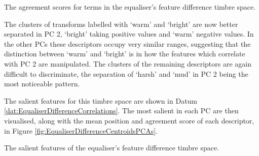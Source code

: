 			\begin{table}[h!]
				\centering
				
				\caption{The agreement scores for terms in the 
					 equaliser's feature difference timbre space.}
				\label{tab:EqualiserDifferenceAgreements}
			\end{table}

			The clusters of transforms labelled with `warm' and `bright' are now better separated in PC 2,
			`bright' taking positive values and `warm' negative values. In the other PCs these descriptors
			occupy very similar ranges, suggesting that the distinction between `warm' and `bright' is in how
			the features which correlate with PC 2 are manipulated. The clusters of the remaining descriptors
			are again difficult to discriminate, the separation of `harsh' and `mud' in PC 2 being the most
			noticeable pattern.

			The salient features for this timbre space are shown in Datum
			\ref{dat:EqualiserDifferenceCorrelations}. The most salient in each PC are then visualised, along
			with the mean position and agreement score of each descriptor, in Figure
			\ref{fig:EqualiserDifferenceCentroidsPCAs}. 

			\begin{datum}[h!]
				\centering
				\begin{minipage}{0.9\textwidth}
					
				\end{minipage}
				\caption{The salient features of the equaliser's
					 feature difference timbre space.}
				\label{dat:EqualiserDifferenceCorrelations}
			\end{datum}

